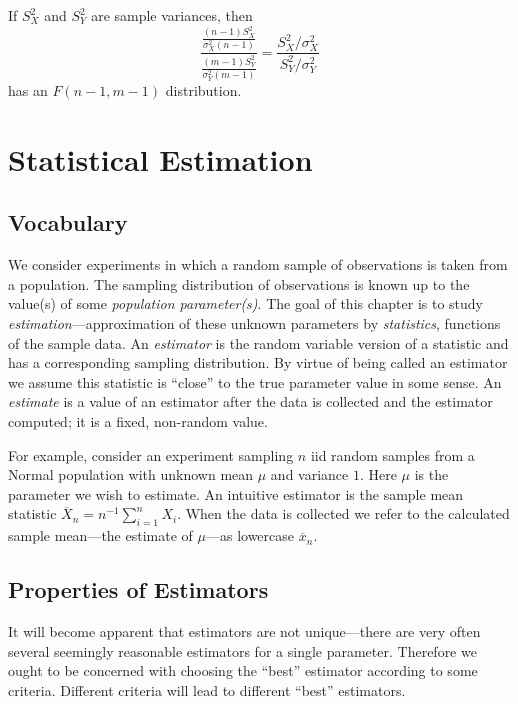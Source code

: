 \documentclass[
]{book}
\begin{document}
If \(S_X^2\) and \(S_Y^2\) are sample variances, then
\[\frac{\frac{(n-1)S_X^2}{\sigma_X^2(n-1)}}{\frac{(m-1)S_Y^2}{\sigma_Y^2(m-1)}} = \frac{S_X^2/\sigma_X^2}{S_Y^2/\sigma_Y^2}\]
has an \(F(n-1, m-1)\) distribution.

\hypertarget{statistical-estimation}{%
\chapter{Statistical Estimation}\label{statistical-estimation}}

\hypertarget{vocabulary}{%
\section{Vocabulary}\label{vocabulary}}

We consider experiments in which a random sample of observations is taken from a population. The sampling distribution of observations is known up to the value(s) of some \emph{population parameter(s)}. The goal of this chapter is to study \emph{estimation}---approximation of these unknown parameters by \emph{statistics}, functions of the sample data. An \emph{estimator} is the random variable version of a statistic and has a corresponding sampling distribution. By virtue of being called an estimator we assume this statistic is ``close'' to the true parameter value in some sense. An \emph{estimate} is a value of an estimator after the data is collected and the estimator computed; it is a fixed, non-random value.

For example, consider an experiment sampling \(n\) iid random samples from a Normal population with unknown mean \(\mu\) and variance \(1\). Here \(\mu\) is the parameter we wish to estimate. An intuitive estimator is the sample mean statistic \(\overline X_n = n^{-1}\sum_{i=1}^n X_i\). When the data is collected we refer to the calculated sample mean---the estimate of \(\mu\)---as lowercase \(\overline x_n\).

\hypertarget{properties-of-estimators}{%
\section{Properties of Estimators}\label{properties-of-estimators}}

It will become apparent that estimators are not unique---there are very often several seemingly reasonable estimators for a single parameter. Therefore we ought to be concerned with choosing the ``best'' estimator according to some criteria. Different criteria will lead to different ``best'' estimators.
\end{document}
